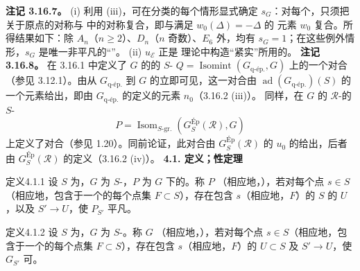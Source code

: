 \textbf{注记 3.16.7。} (i) 利用 (iii)，可在分类的每个情形显式确定 $s_G$：对每个，只须把关于原点的对称与 中的对称复合，即与满足 $w_0(\Delta)=-\Delta$ 的 元素 $w_0$ 复合。所得结果如下：除 $A_n$（$n\geq2$）、$D_n$（$n$ 奇数）、$E_6$ 外，均有 $s_G=1$；在这些例外情形，$s_G$ 是唯一非平凡的“”。
(ii)  $u_{\mathcal E}$ 正是 理论中构造“紧实”所用的。
\textbf{注记 3.16.8。} 在 3.16.1 中定义了 $G$ 的的 $S$- $Q=\operatorname{Isomint}(G_{\mathrm{q\text{-}ép.}},G)$ 上的一个对合（参见 3.12.1）。由从 $G_{\mathrm{q\text{-}ép.}}$ 到 $G$ 的立即可见，这一对合由 $\operatorname{ad}(G_{\mathrm{q\text{-}ép.}})(S)$ 的一个元素给出，即由 $G_{\mathrm{q\text{-}ép.}}$ 的定义的元素 $n_0$（3.16.2 (iii)）。
同样，在 $G$ 的 $\mathcal R$-的 $S$-
\[P=\operatorname{Isom}_{S\text{-gr.}}(G^{\mathrm{Ép}}_S(\mathcal R),G)\]
上定义了对合（参见 1.20）。同前论证，此对合由 $G^{\mathrm{Ép}}_S(\mathcal R)$ 的 $u_0$ 的给出，后者由 $G^{\mathrm{Ép}}_S(\mathcal R)$ 的定义（3.16.2 (iv)）。
\textbf{4.1. 定义；性定理}
\begin{SGAresult}{定义}{4.1.1}
设 $S$ 为，$G$ 为 $S$-，$P$ 为 $G$ 下的。称 $P$ （相应地，），若对每个点 $s\in S$（相应地，包含于一个的每个点集 $F\subset S$），存在包含 $s$（相应地，$F$）的 $S$ 的 $U$，以及 $S'\to U$，使 $P_{S'}$ 平凡。
\end{SGAresult}
\begin{SGAresult}{定义}{4.1.2}
设 $S$ 为，$G$ 为 $S$-。称 $G$ （相应地，），若对每个点 $s\in S$（相应地，包含于一个的每个点集 $F\subset S$），存在包含 $s$（相应地，$F$）的 $U\subset S$ 及 $S'\to U$，使 $G_{S'}$ 可。
\end{SGAresult}
